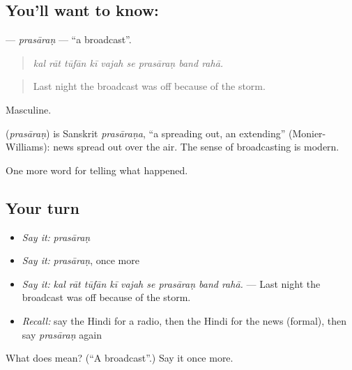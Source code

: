 \subsection*{You'll want to know: }
\textbf{} — \emph{prasāraṇ} — \textquotedblleft{}a broadcast\textquotedblright{}.

\begin{quote}
        
\end{quote}

\begin{quote}
\emph{kal rāt tūfān kī vajah se prasāraṇ band rahā.}
\end{quote}

\begin{quote}
Last night the broadcast was off because of the storm.
\end{quote}

Masculine.

\begin{cousinweb}
\textbf{} (\emph{prasāraṇ}) is Sanskrit \emph{prasāraṇa}, \textquotedblleft{}a spreading out, an extending\textquotedblright{} (Monier-Williams): news spread out over the air. The sense of broadcasting is modern.
\end{cousinweb}

\begin{grammarlens}[title={What you've built}]
One more word for telling what happened.
\end{grammarlens}

\subsection*{Your turn}
\begin{itemize}
\raggedright
  \item \emph{Say it:} \emph{prasāraṇ}
  \item \emph{Say it:} \emph{prasāraṇ}, once more
  \item \emph{Say it:} \emph{kal rāt tūfān kī vajah se prasāraṇ band rahā.} — Last night the broadcast was off because of the storm.
  \item \emph{Recall:} say the Hindi for a radio, then the Hindi for the news (formal), then say \emph{prasāraṇ} again
\end{itemize}

\begin{tcolorbox}[breakable,colback=teal!4,colframe=teal!35!black,title={Before you move on}]
What does  mean? (\textquotedblleft{}A broadcast\textquotedblright{}.) Say it once more.
\end{tcolorbox}
